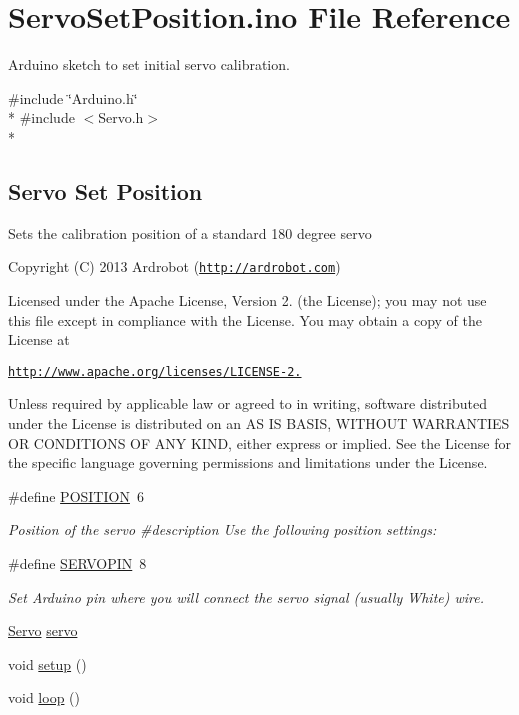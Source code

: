 \hypertarget{_servo_set_position_8ino}{\section{Servo\-Set\-Position.\-ino File Reference}
\label{_servo_set_position_8ino}
}


Arduino sketch to set initial servo calibration.  


{\ttfamily \#include \char`\"{}Arduino.\-h\char`\"{}}\\*
{\ttfamily \#include $<$Servo.\-h$>$}\\*
\subsection*{Servo Set Position}
\label{_amgrp0d2faeb5d495fed297f0efccbd8ef931}%
Sets the calibration position of a standard 180 degree servo \begin{DoxyCopyright}{Copyright}
(C) 2013 Ardrobot (\href{http://ardrobot.com}{\tt http\-://ardrobot.\-com})
\end{DoxyCopyright}
Licensed under the Apache License, Version 2. (the License); you may not use this file except in compliance with the License. You may obtain a copy of the License at

\href{http://www.apache.org/licenses/LICENSE-2.0}{\tt http\-://www.\-apache.\-org/licenses/\-L\-I\-C\-E\-N\-S\-E-\/2.}

Unless required by applicable law or agreed to in writing, software distributed under the License is distributed on an A\-S I\-S B\-A\-S\-I\-S, W\-I\-T\-H\-O\-U\-T W\-A\-R\-R\-A\-N\-T\-I\-E\-S O\-R C\-O\-N\-D\-I\-T\-I\-O\-N\-S O\-F A\-N\-Y K\-I\-N\-D, either express or implied. See the License for the specific language governing permissions and limitations under the License. \begin{DoxyCompactItemize}
\item 
\#define \hyperlink{_servo_set_position_8ino_a440f0e10bb28b153f5661c934bc6b89f}{P\-O\-S\-I\-T\-I\-O\-N}~6
\begin{DoxyCompactList}\small\item\em Position of the servo \#description Use the following position settings\-: \end{DoxyCompactList}\item 
\#define \hyperlink{_servo_set_position_8ino_a64a5788920049543903e587c2ca9db7d}{S\-E\-R\-V\-O\-P\-I\-N}~8
\begin{DoxyCompactList}\small\item\em Set Arduino pin where you will connect the servo signal (usually White) wire. \end{DoxyCompactList}\item 
\hyperlink{class_servo}{Servo} \hyperlink{_servo_set_position_8ino_a79efceea669fb85a732c30f47cf7e59c}{servo}
\item 
void \hyperlink{_servo_set_position_8ino_a4fc01d736fe50cf5b977f755b675f11d}{setup} ()
\item 
void \hyperlink{_servo_set_position_8ino_afe461d27b9c48d5921c00d521181f12f}{loop} ()
\end{DoxyCompactItemize}


